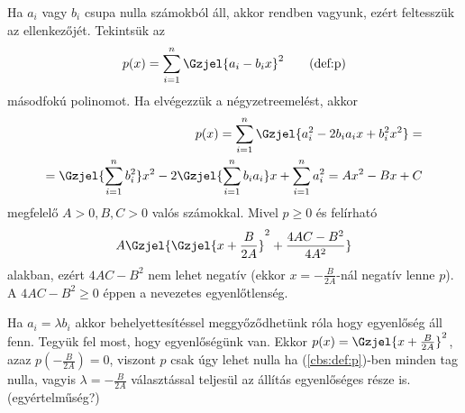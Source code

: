 Ha $a_{i}$ vagy $b_{i}$ csupa nulla számokból áll, akkor rendben vagyunk, 
ezért feltesszük az ellenkezőjét. Tekintsük az
\begin{equation}
p(x)=\sum_{i=1}^{n} \Gzjel{ a_{i}-b_{i}x }^2
\label{cbs:def:p}\tag{def:p}
\end{equation}
másodfokú polinomot. Ha elvégezzük a négyzetreemelést, akkor
\begin{align*}
p(x)=\sum_{i=1}^{n} \Gzjel{ a_{i}^{2}-2b_{i}a_{i}x + b_{i}^{2}x^{2} }=\\
= \Gzjel{\sum_{i=1}^{n}b_{i}^{2}}x^{2} -2\Gzjel{ \sum_{i=1}^{n}b_{i}a_{i}}x +\sum_{i=1}^{n} a_{i}^{2} =
Ax^{2}-Bx+C
\end{align*}
megfelelő $A>0,B,C>0$ valós számokkal. Mivel $p\ge 0$ és felírható
$$
A\Gzjel{ \Gzjel{ x+\frac{B}{2A}}^2 + \frac{4AC-B^{2}}{4A^{2}} }
$$
alakban, ezért $4AC-B^{2}$ nem lehet negatív (ekkor $x=-\frac{B}{2A}$-nál negatív lenne $p$).
A $4AC-B^{2}\ge 0$ éppen a nevezetes egyenlőtlenség. 
\par Ha $a_{i}=\lambda b_{i}$ akkor behelyettesítéssel meggyőződhetünk róla hogy 
egyenlőség áll fenn. Tegyük fel most, hogy egyenlőségünk van. Ekkor 
$p(x)=\Gzjel{ x+\frac{B}{2A}}^2$, azaz $p(-\frac{B}{2A})=0$, viszont $p$ 
csak úgy lehet nulla ha (\ref{cbs:def:p})-ben minden tag nulla, 
vagyis $\lambda=-\frac{B}{2A}$ választással teljesül az állítás egyenlőséges része is. 
(egyértelműség?)
